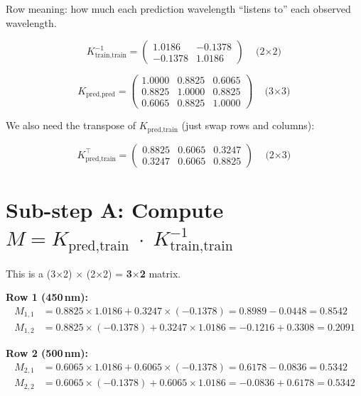 \documentclass[11pt, a4paper]{article}
\begin{document}
Row meaning: how much each prediction wavelength ``listens to'' each observed wavelength.

\begin{equation}
K_{\text{train,train}}^{-1} =
\begin{pmatrix}
1.0186 & -0.1378 \\
-0.1378 & 1.0186
\end{pmatrix}
\quad \text{(2$\times$2)}
\tag{S6-3}
\end{equation}

\begin{equation}
K_{\text{pred,pred}} =
\begin{pmatrix}
1.0000 & 0.8825 & 0.6065 \\
0.8825 & 1.0000 & 0.8825 \\
0.6065 & 0.8825 & 1.0000
\end{pmatrix}
\quad \text{(3$\times$3)}
\tag{S6-4}
\end{equation}

We also need the transpose of $K_{\text{pred,train}}$ (just swap rows and columns):

\begin{equation}
K_{\text{pred,train}}^\top =
\begin{pmatrix}
0.8825 & 0.6065 & 0.3247 \\
0.3247 & 0.6065 & 0.8825
\end{pmatrix}
\quad \text{(2$\times$3)}
\tag{S6-5}
\end{equation}


\section*{\color{secblue}Sub-step A: Compute $M = K_{\text{pred,train}} \;\cdot\; K_{\text{train,train}}^{-1}$}

This is a (3$\times$2) $\times$ (2$\times$2) = \textbf{3$\times$2} matrix.

\bigskip
\textbf{Row 1 (450\,nm):}
\begin{align}
M_{1,1} &= 0.8825 \times 1.0186 + 0.3247 \times (-0.1378) = 0.8989 - 0.0448 = \mathbf{0.8542} \tag{S6-6a} \\
M_{1,2} &= 0.8825 \times (-0.1378) + 0.3247 \times 1.0186 = -0.1216 + 0.3308 = \mathbf{0.2091} \tag{S6-6b}
\end{align}

\textbf{Row 2 (500\,nm):}
\begin{align}
M_{2,1} &= 0.6065 \times 1.0186 + 0.6065 \times (-0.1378) = 0.6178 - 0.0836 = \mathbf{0.5342} \tag{S6-7a} \\
M_{2,2} &= 0.6065 \times (-0.1378) + 0.6065 \times 1.0186 = -0.0836 + 0.6178 = \mathbf{0.5342} \tag{S6-7b}
\end{align}
\end{document}
